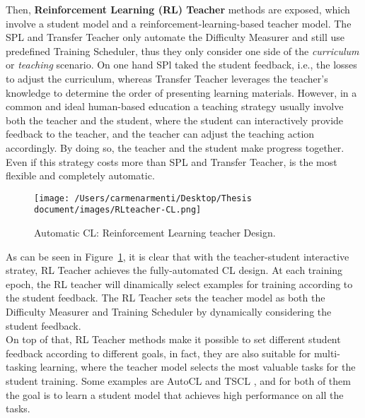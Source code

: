 Then, \textbf{Reinforcement Learning (RL) Teacher} methods are exposed, which involve a student model and a reinforcement-learning-based 
teacher model. The SPL and Transfer Teacher only automate the Difficulty Measurer and still use predefined
Training Scheduler, thus they only consider one side of the \textit{curriculum} or \textit{teaching} scenario. On one hand
SPl taked the student feedback, i.e., the losses to adjust the curriculum, whereas Transfer Teacher leverages the teacher's knowledge
to determine the order of presenting learning materials. However, in a common and ideal human-based education a teaching strategy
usually involve both the teacher and the student, where the student can interactively provide feedback to the teacher, and the teacher 
can adjust the teaching action accordingly. By doing so, the teacher and the student make progress together.
Even if this strategy costs more than SPL and Transfer Teacher, is the most flexible and completely automatic.
\begin{figure}[h]
    \begin{center}
        \texttt{[image: /Users/carmenarmenti/Desktop/Thesis document/images/RLteacher-CL.png]}
        \caption{\label{fig:RLteacher-CL}Automatic CL: Reinforcement Learning teacher Design.}
    \end{center}
\end{figure}
As can be seen in Figure~\ref{fig:RLteacher-CL}, it is clear that with the teacher-student interactive
stratey, RL Teacher achieves the fully-automated CL design. At each training epoch, the RL teacher
will dinamically select examples for training according to the student feedback. The RL Teacher 
sets the teacher model as both the Difficulty Measurer and Training Scheduler by dynamically considering 
the student feedback.\\
On top of that, RL Teacher methods make it possible to set different student feedback according 
to different goals, in fact, they are also suitable for multi-tasking learning, where the teacher model 
selects the most valuable tasks for the student training. Some examples are AutoCL \cite{graves2017automated} and TSCL \cite{matiisen2019teacher}, and for both of them the goal is 
to learn a student model that achieves high performance on all the tasks.

